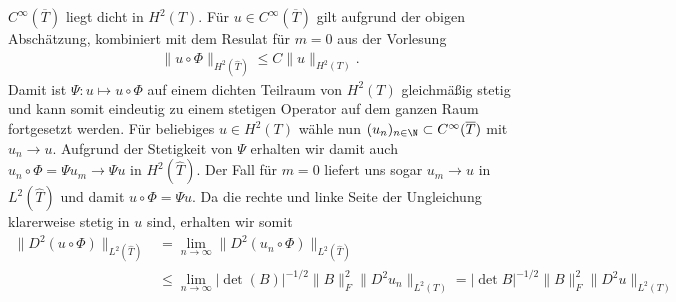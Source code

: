 \begin{solution}
$C^{\infty}(\overline{T})$ liegt dicht in $H^2(T)$. Für $u \in C^{\infty}(\overline{T})$
gilt aufgrund der obigen Abschätzung, kombiniert mit dem Resulat für $m=0$
aus der Vorlesung
\begin{align*}
  \|u\circ \Phi\|_{H^2(\hat{T})} \leq C\|u\|_{H^2(T)}.
\end{align*}
Damit ist $\Psi: u \mapsto u \circ \Phi$ auf einem dichten
Teilraum von $H^2(T)$ gleichmäßig stetig und kann somit eindeutig zu einem
stetigen Operator auf dem ganzen Raum fortgesetzt werden.
Für beliebiges $u \in H^2(T)$ wähle nun $(u_n)_{n \in \N} \subset C^{\infty}(\overline{T})$
mit $u_n \to u$. Aufgrund der Stetigkeit von $\Psi$ erhalten wir damit auch
$u_n \circ \Phi = \Psi u_m \to \Psi u$ in $H^2(\hat{T})$.
Der Fall für $m=0$ liefert uns sogar $u_m \to u$ in $L^2(\hat{T})$ und damit $u \circ \Phi = \Psi u$.
Da die rechte und linke Seite der Ungleichung klarerweise stetig in $u$ sind, erhalten wir somit
\begin{align*}
  \|D^2(u\circ\Phi)\|_{L^2(\hat{T})} &= \lim_{n\to\infty}\|D^2(u_n\circ\Phi)\|_{L^2(\hat{T})} \\
  &\leq \lim_{n\to\infty} |\det(B)|^{-1/2}\|B\|_F^2\|D^2u_n\|_{L^2(T)}
  = |\det B|^{-1/2}\|B\|_F^2\|D^2u\|_{L^2(T)}
\end{align*}
\end{solution}


